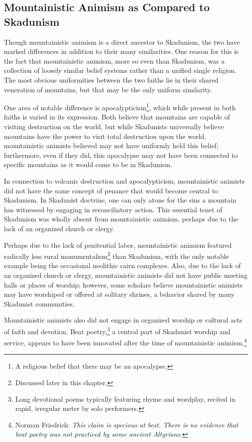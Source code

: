 \subsection{Mountainistic Animism as Compared to Skadunism}

Though mountainistic animism is a direct ancestor to Skadunism, the two have marked differences in addition to their many similarities. One reason for this is the fact that mountainistic animism, more so even than Skadunism, was a collection of loosely similar belief systems rather than a unified single religion. The most obvious uniformities between the two faiths lie in their shared veneration of mountains, but that may be the only uniform similarity. \par 

One area of notable difference is apocalypticism\footnote{A religious belief that there may be an apocalypse.}, which while present in both faiths is varied in its expression. Both believe that mountains are capable of visiting destruction on the world, but while Skadunists universally believe mountains have the power to visit total destruction upon the world, mountainistic animists believed may not have uniformly held this belief; furthermore, even if they did, this apocalypse may not have been connected to specific mountains as it would come to be in Skadunism.\par 

In connection to volcanic destruction and apocalypticism, mountainistic animists did not have the same concept of penance that would become central to Skadunism. In Skadunist doctrine, one can only atone for the sins a mountain has witnessed by engaging in reconciliatory action. This essential tenet of Skadunism was wholly absent from mountainistic animism, perhaps due to the lack of an organized church or clergy.\par 

Perhaps due to the lack of penitential labor, mountainistic animism featured radically less rural monumentalism\footnote{Discussed later in this chapter.} than Skadunism, with the only notable example being the occasional neolithic cairn complexes. Also, due to the lack of an organized church or clergy, mountainistic animists did not have public meeting halls or places of worship; however, some scholars believe mountainistic animists may have worshiped or offered at solitary shrines, a behavior shared by many Skadunist communities.\par 

Mountainistic animists also did not engage in organized worship or cultural acts of faith and devotion. Beat poetry,\footnote{Long devotional poems typically featuring rhyme and wordplay, recited in rapid, irregular meter by solo performers.} a central part of Skadunist worship and service, appears to have been innovated after the time of mountainistic animism.\footnote{Norman Friedrich: \textit{This claim is specious at best. There is no evidence that beat poetry was not practiced by some ancient Altyrians.}}


